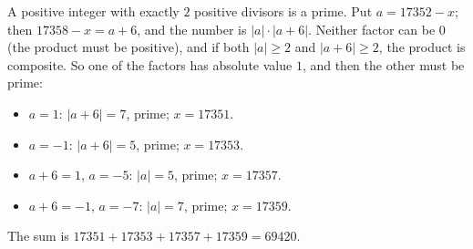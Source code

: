 A positive integer with exactly $2$ positive divisors is a prime. Put $a=17352-x$; then $17358-x=a+6$, and the number is $|a|\cdot|a+6|$. Neither factor can be $0$ (the product must be positive), and if both $|a|\ge2$ and $|a+6|\ge2$, the product is composite. So one of the factors has absolute value $1$, and then the other must be prime:
\begin{itemize}
\item $a=1$: $|a+6|=7$, prime; $x=17351$.
\item $a=-1$: $|a+6|=5$, prime; $x=17353$.
\item $a+6=1$, $a=-5$: $|a|=5$, prime; $x=17357$.
\item $a+6=-1$, $a=-7$: $|a|=7$, prime; $x=17359$.
\end{itemize}
The sum is $17351+17353+17357+17359=\boxed{69420}$.
